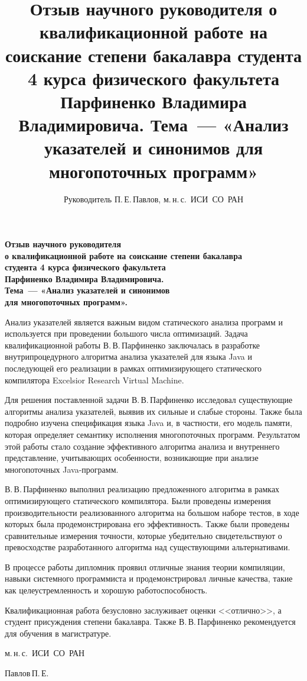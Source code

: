 \documentclass[12pt]{article}
\title{
  Отзыв научного руководителя о квалификационной работе на соискание степени
  бакалавра студента 4 курса физического факультета Парфиненко Владимира
  Владимировича.
  Тема~--- «Анализ указателей и синонимов для многопоточных программ»
}
\author{
  Руководитель П.\,Е.\,Павлов, м.\,н.\,с.~ИСИ~СО~РАН
}
\newcommand{\eng}[1]{{\English#1}}
\def\parf{В.\,В.\,Парфиненко\xspace}
\begin{document}
  \thispagestyle{empty}

  \begin{center}
    \bfseries
    Отзыв научного руководителя\\
    о квалификационной работе на соискание степени бакалавра\\
    студента 4 курса физического факультета\\
    Парфиненко Владимира Владимировича.\\
    Тема~--- «Анализ указателей и синонимов\\
    для многопоточных программ».
  \end{center}
  \vspace{0.5cm}

  Анализ указателей является важным видом статического анализа программ и
  используется при проведении большого числа оптимизаций. Задача
  квалификационной работы \parf заключалась в разработке внутрипроцедурного
  алгоритма анализа указателей для языка \eng{Java} и последующей его
  реализации в рамках оптимизирующего статического компилятора \eng{Excelsior
  Research Virtual Machine}.

  Для решения поставленной задачи \parf исследовал существующие алгоритмы
  анализа указателей, выявив их сильные и слабые стороны. Также была подробно
  изучена спецификация языка \eng{Java} и, в частности, его модель памяти,
  которая определяет семантику исполнения многопоточных программ. Результатом
  этой работы стало создание эффективного алгоритма анализа и внутреннего
  представление, учитывающих особенности, возникающие при анализе многопоточных
  \eng{Java}-программ.

  \parf выполнил реализацию предложенного алгоритма в рамках оптимизирующего
  статического компилятора. Были проведены измерения производительности
  реализованного алгоритма на большом наборе тестов, в ходе которых была
  продемонстрирована его эффективность.
  Также были проведены сравнительные измерения точности, которые убедительно
  свидетельствуют о превосходстве разработанного алгоритма над существующими
  альтернативами.

  В процессе работы дипломник проявил отличные знания теории компиляции, навыки
  системного программиста и продемонстрировал личные качества, такие как
  целеустремленность и хорошую работоспособность.

  Квалификационная работа безусловно заслуживает оценки <<отлично>>, а студент
  присуждения степени бакалавра. Также \parf рекомендуется для обучения в
  магистратуре.

  \vspace{0.2cm}

  \begin{flushright}

    м.\,н.\,с.~ИСИ~СО~РАН

    Павлов\,П.\,Е.

  \end{flushright}
\end{document}
